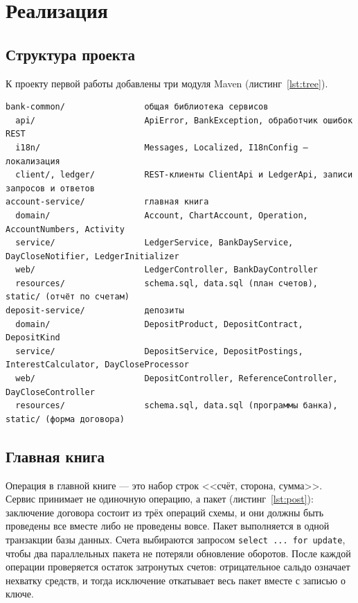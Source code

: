 \documentclass[14pt,a4paper]{extarticle}
\begin{document}
\section{Реализация}

\subsection{Структура проекта}

К проекту первой работы добавлены три модуля Maven (листинг~\ref{lst:tree}).

\begin{Verbatim}[fontsize=\footnotesize, frame=single, rulecolor=\color{codeframe}]
bank-common/                общая библиотека сервисов
  api/                      ApiError, BankException, обработчик ошибок REST
  i18n/                     Messages, Localized, I18nConfig — локализация
  client/, ledger/          REST-клиенты ClientApi и LedgerApi, записи запросов и ответов
account-service/            главная книга
  domain/                   Account, ChartAccount, Operation, AccountNumbers, Activity
  service/                  LedgerService, BankDayService, DayCloseNotifier, LedgerInitializer
  web/                      LedgerController, BankDayController
  resources/                schema.sql, data.sql (план счетов), static/ (отчёт по счетам)
deposit-service/            депозиты
  domain/                   DepositProduct, DepositContract, DepositKind
  service/                  DepositService, DepositPostings, InterestCalculator, DayCloseProcessor
  web/                      DepositController, ReferenceController, DayCloseController
  resources/                schema.sql, data.sql (программы банка), static/ (форма договора)
\end{Verbatim}

\subsection{Главная книга}

Операция в главной книге --- это набор строк <<счёт, сторона, сумма>>. Сервис принимает не
одиночную операцию, а пакет (листинг~\ref{lst:post}): заключение договора состоит из трёх
операций схемы, и они должны быть проведены все вместе либо не проведены вовсе. Пакет
выполняется в одной транзакции базы данных. Счета выбираются запросом
\texttt{select ... for update}, чтобы два параллельных пакета не потеряли обновление
оборотов. После каждой операции проверяется остаток затронутых счетов: отрицательное сальдо
означает нехватку средств, и тогда исключение откатывает весь пакет вместе с записью о ключе.
\end{document}
